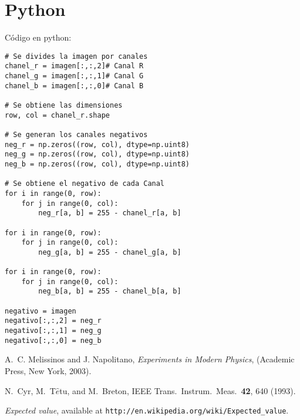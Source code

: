 \documentclass[letterpaper,12pt]{article}
\begin{document}
\section{Python}
Código en python:

\begin{lstlisting}
# Se divides la imagen por canales
chanel_r = imagen[:,:,2]# Canal R
chanel_g = imagen[:,:,1]# Canal G
chanel_b = imagen[:,:,0]# Canal B

# Se obtiene las dimensiones
row, col = chanel_r.shape

# Se generan los canales negativos
neg_r = np.zeros((row, col), dtype=np.uint8)
neg_g = np.zeros((row, col), dtype=np.uint8)
neg_b = np.zeros((row, col), dtype=np.uint8)

# Se obtiene el negativo de cada Canal
for i in range(0, row):                                            
    for j in range(0, col):                                          
        neg_r[a, b] = 255 - chanel_r[a, b]

for i in range(0, row):                                            
    for j in range(0, col):                                          
        neg_g[a, b] = 255 - chanel_g[a, b]

for i in range(0, row):                                            
    for j in range(0, col):                                          
        neg_b[a, b] = 255 - chanel_b[a, b]

negativo = imagen
negativo[:,:,2] = neg_r
negativo[:,:,1] = neg_g
negativo[:,:,0] = neg_b
\end{lstlisting}


\begin{thebibliography}{99}

A.~C. Melissinos and J. Napolitano, \textit{Experiments in Modern Physics},
(Academic Press, New York, 2003).

N.\ Cyr, M.\ T$\hat{e}$tu, and M.\ Breton,
IEEE Trans.\ Instrum.\ Meas.\ \textbf{42}, 640 (1993).

 \emph{Expected value},  available at
\texttt{http://en.wikipedia.org/wiki/Expected\_value}.

\end{thebibliography}
\end{document}
